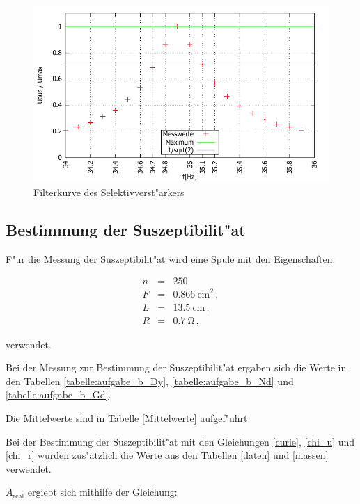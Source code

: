 	\begin{figure}[!h]
		\centering
		\includegraphics[width = 14cm]{img/arschlecken.pdf}
		\caption{Filterkurve des Selektivverst"arkers}
		\label{graph:aufgabe_a}
	\end{figure}

	\clearpage


	\subsection{Bestimmung der Suszeptibilit"at} %
	\label{sub:bestimmung_der_suszeptibilit_t}

	F"ur die Messung der Suszeptibilit"at wird eine Spule mit den Eigenschaften:

	\begin{eqnarray*}
		n &=& 250 \,\\
		F &=& \SI{0.866}{\centi\meter^2} \, ,\\
		L &=& \SI{13.5}{\centi\meter} \, , \\
		R &=& \SI{0.7}{\ohm} \, ,
	\end{eqnarray*}

	verwendet.

	Bei der Messung zur Bestimmung der Suszeptibilit"at ergaben sich die Werte in den Tabellen \ref{tabelle:aufgabe_b_Dy}, \ref{tabelle:aufgabe_b_Nd} und \ref{tabelle:aufgabe_b_Gd}.

	Die Mittelwerte sind in Tabelle \ref{Mittelwerte} aufgef"uhrt.

	Bei der Bestimmung der Suszeptibilit"at mit den Gleichungen \eqref{curie}, \eqref{chi_u} und \eqref{chi_r} wurden zus"atzlich die  Werte aus den Tabellen \ref{daten} und \ref{massen} verwendet.

	$A_\mathrm{real}$ ergiebt sich mithilfe der Gleichung:

